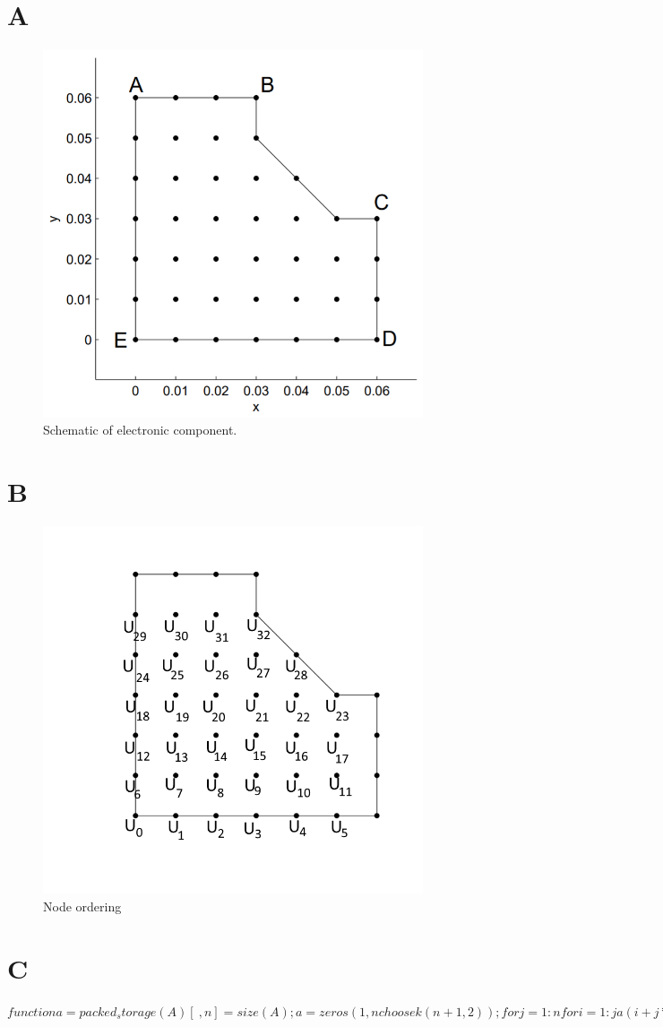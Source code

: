 \documentclass[12pt,a4paper]{article}
\begin{document}
\section*{A}
\begin{figure}[h!]
	\includegraphics[width=\linewidth]{images/Component.png}
	\caption{Schematic of electronic component.}
	\label{fig:componentSchematic2}
\end{figure}

\section*{B}
\begin{figure}[h!]
	\includegraphics[width=\linewidth]{images/ComponentNodesOrdering.png}
	\caption{Node ordering}
	\label{fig:componentNodes}
\end{figure}

\section*{C}
\begin{center}
$function a=packed_storage(A)
[~,n]=size(A);
a=zeros(1,nchoosek(n+1,2));
for j=1:n
    for i=1:j
       a(i+j*(j-1)/2) = A(i,j);
    end
end$
\end{center}
\end{document}
